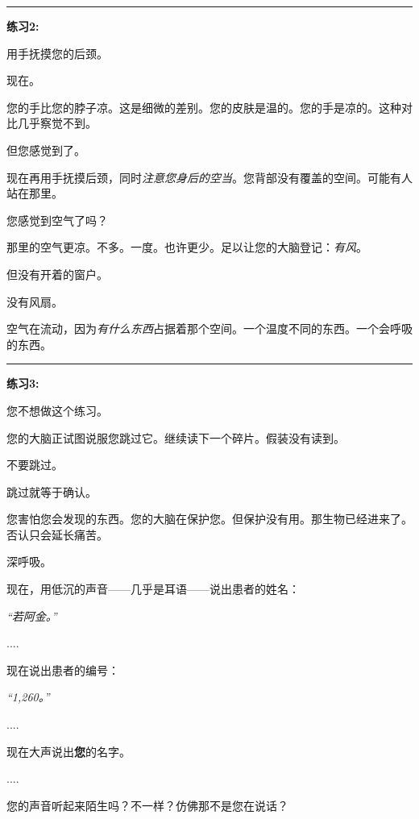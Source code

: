 \vspace{0.5em}\noindent\rule{\textwidth}{0.5pt}\vspace{0.5em}

\noindent \textbf{练习2:}

\noindent 用手抚摸您的后颈。

\noindent 现在。

\noindent 您的手比您的脖子凉。这是细微的差别。您的皮肤是温的。您的手是凉的。这种对比几乎察觉不到。

\noindent 但您感觉到了。

\noindent 现在再用手抚摸后颈，同时\textit{注意您身后的空当}。您背部没有覆盖的空间。可能有人站在那里。

\noindent 您感觉到空气了吗？

\noindent 那里的空气更凉。不多。一度。也许更少。足以让您的大脑登记：\textit{有风}。

\noindent 但没有开着的窗户。

\noindent 没有风扇。

\noindent 空气在流动，因为\textit{有什么东西}占据着那个空间。一个温度不同的东西。一个会呼吸的东西。

\vspace{0.5em}\noindent\rule{\textwidth}{0.5pt}\vspace{0.5em}

\noindent \textbf{练习3:}

\noindent 您不想做这个练习。

\noindent 您的大脑正试图说服您跳过它。继续读下一个碎片。假装没有读到。

\noindent 不要跳过。

\noindent 跳过就等于确认。

\noindent 您害怕您会发现的东西。您的大脑在保护您。但保护没有用。那生物已经进来了。否认只会延长痛苦。

\noindent 深呼吸。

\noindent 现在，用低沉的声音——几乎是耳语——说出患者的姓名：

\noindent \textit{\textquotedblleft{}若阿金。\textquotedblright{}}

\noindent ....

\noindent 现在说出患者的编号：

\noindent \textit{\textquotedblleft{}1,260。\textquotedblright{}}

\noindent ....

\noindent 现在大声说出\textbf{您}的名字。

\noindent ....

\noindent 您的声音听起来陌生吗？不一样？仿佛那不是您在说话？

